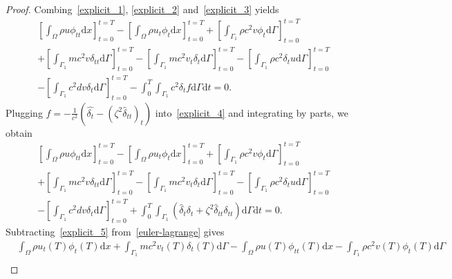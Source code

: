 \documentclass[10pt,a4paper]{amsart}
\begin{document}
\begin{proof}
Combing~\eqref{explicit_1}, \eqref{explicit_2} and~\eqref{explicit_3} yields
\begin{equation}\label{explicit_4}
\begin{split}
&\left[\int_{\Omega}\rho u {\phi}_{tt} \mathrm{d}x\right]_{t=0}^{t=T} - \left[\int_{\Omega}\rho u_{t} {\phi_t}\mathrm{d}x \right]_{t=0}^{t=T} + \left[\int_{\Gamma_1}\rho c^{2}v  {\phi_t}\mathrm{d}\Gamma\right]_{t=0}^{t=T}\\
&+\left[\int_{\Gamma_1}m c^{2}v  {\delta}_{tt}\mathrm{d}\Gamma\right]_{t=0}^{t=T} - \left[\int_{\Gamma_1}m c^{2}v_{t}  {\delta_t}\mathrm{d}\Gamma\right]_{t=0}^{t=T}-\left[\int_{\Gamma_1}\rho c^{2}  {\delta_t} u\mathrm{d}\Gamma\right]_{t=0}^{t=T}\\
&-\left[\int_{\Gamma_1} c^{2} d {v}\delta_t\mathrm{d}\Gamma \right]_{t=0}^{t=T} - \int_{0}^{T}\int_{\Gamma_1}c^{2}\delta_t f\mathrm{d}\Gamma \mathrm{d}t=0.
 \end{split}
\end{equation}
Plugging $f = -\frac{1}{c^2}\left(\hat{\delta_t} - (\zeta^2\hat{\delta}_{tt})_t\right)$ into~\eqref{explicit_4} and integrating by parts, we obtain
\begin{equation}\label{explicit_5}
\begin{split}
&\left[\int_{\Omega}\rho u {\phi}_{tt} \mathrm{d}x\right]_{t=0}^{t=T} - \left[\int_{\Omega}\rho u_{t} {\phi_t}\mathrm{d}x \right]_{t=0}^{t=T} + \left[\int_{\Gamma_1}\rho c^{2}v  {\phi_t}\mathrm{d}\Gamma\right]_{t=0}^{t=T}\\
&+\left[\int_{\Gamma_1}m c^{2}v  {\delta}_{tt}\mathrm{d}\Gamma\right]_{t=0}^{t=T} - \left[\int_{\Gamma_1}m c^{2}v_{t}  {\delta_t}\mathrm{d}\Gamma\right]_{t=0}^{t=T}-\left[\int_{\Gamma_1}\rho c^{2}  {\delta_t} u\mathrm{d}\Gamma\right]_{t=0}^{t=T}\\
&-\left[\int_{\Gamma_1} c^{2} d {v}\delta_t\mathrm{d}\Gamma \right]_{t=0}^{t=T}+ \int_{0}^{T}\int_{\Gamma_1} \left(\hat{\delta}_{t}\delta_t  + \zeta^2\hat{\delta}_{tt} \delta_{tt}\right)\mathrm{d}\Gamma \mathrm{d}t=0.
 \end{split}
\end{equation}
Subtracting~\eqref{explicit_5} from~\eqref{euler-lagrange} gives
\begin{equation}\label{explicit_6}
\begin{split}
&\int_{\Omega}\rho u_{t}(T)\phi_t(T)\mathrm{d}x + \int_{\Gamma_1}m c^2 v_{t}(T)\delta_t(T)\mathrm{d}\Gamma- \int_{\Omega}\rho u(T)\phi_{tt}(T)\mathrm{d}x - \int_{\Gamma_1}\rho c^2 v(T)\phi_t(T)\mathrm{d}\Gamma\\

\end{split}
\end{equation}
\end{proof}
\end{document}
